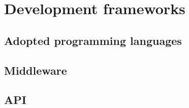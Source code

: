 \section{Development frameworks}

\subsection{Adopted programming languages}

\subsection{Middleware}

\subsection{API}